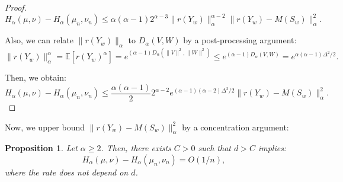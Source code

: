 \documentclass{article}
\theoremstyle{plain}
\newtheorem{proposition}{Proposition}[section]
\theoremstyle{definition}
\theoremstyle{remark}
\begin{document}
\begin{proof}
    \[H_\alpha(\mu, \nu) - H_\alpha(\mu_n, \nu_n) \leq \alpha(\alpha-1) 2^{\alpha-3}\|r(Y_w)\|_\alpha^{\alpha-2} \|r(Y_w)-M(S_w)\|_\alpha^2.\]

    Also, we can relate $\|r(Y_w)\|_\alpha$ to $D_\alpha(V,W)$ by a post-processing argument: \[\|r(Y_w)\|_\alpha^\alpha = \mathbb{E}\left[r(Y_w)^\alpha\right] = e^{(\alpha-1)D_\alpha(\|V\|^2,\|W\|^2)} \leq e^{(\alpha-1)D_\alpha(V,W)} = e^{\alpha(\alpha-1)\Delta^2/2} .\]

    Then, we obtain: 
    \[H_\alpha(\mu, \nu) - H_\alpha(\mu_n, \nu_n) \leq \frac{\alpha(\alpha-1)}{2} 2^{\alpha-2}e^{(\alpha-1)(\alpha-2)\Delta^2/2} \|r(Y_w)-M(S_w)\|_\alpha^2.\]
    \end{proof}
    Now, we upper bound $\|r(Y_w)-M(S_w)\|_\alpha^2$ by a concentration argument:
    \begin{proposition}
    Let $\alpha \geq 2$. Then, there exists $C > 0$ such that $d > C$ implies:
        \[H_\alpha(\mu, \nu) - H_\alpha(\mu_n, \nu_n) = O(1/n),\]
        where the rate does not depend on $d$.
    \end{proposition}
\end{document}
